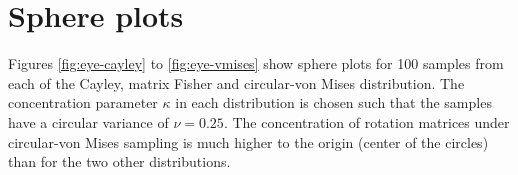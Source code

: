 \documentclass[12pt]{article}
\begin{document}


\section{Sphere plots}
\label{sec:appendix.eyeballs}
Figures \ref{fig:eye-cayley} to \ref{fig:eye-vmises} show sphere plots for 100 samples from each of the Cayley, matrix Fisher and circular-von Mises distribution. The concentration parameter $\kappa$ in each distribution is chosen such that the samples have a circular variance of $\nu = 0.25$. The concentration of rotation matrices under circular-von Mises sampling is much higher to the origin (center of the circles) than for the two other distributions.
\end{document}
